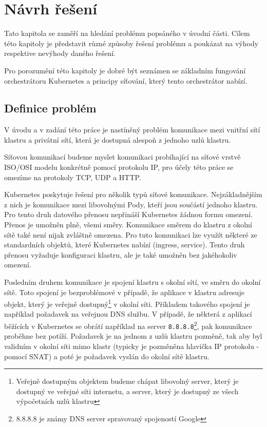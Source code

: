 \chapter{Návrh řešení}

\begin{chapterabstract}
Tato kapitola se zaměří na hledání problému popsáného v úvodní části. Cílem této kapitoly je představit různé způsoby řešení problému a poukázat na výhody respektive nevýhody daného řešení.

Pro porozumění této kapitoly je dobré být seznámen se základním fungování orchestrátoru Kubernetes a principy síťování, který tento orchestrátor nabízí.  
\end{chapterabstract}


\section{Definice problém}
V úvodu a v zadání této práce je nastíněný problém komunikace mezi vnitřní sítí klastru a privátní sítí, která je dostupná alespoň z jednoho uzlů klastru. 

Síťovou komunikací budeme myslet komunikaci probíhající na síťové vrstvě ISO/OSI modelu konkrétně pomocí protokolu IP, pro účely této práce se omezíme na protokoly TCP, UDP a HTTP.

Kubernetes poskytuje řešení pro několik typů síťové komunikace. Nejzákladnějším z nich je komunikace mezi libovolnými Pody, kteří jsou součástí jednoho klastru. Pro tento druh datového přenosu nepřináší Kubernetes žádnou formu omezení. Přenos je umožněn plně, všemi směry. Komunikace směrem do klastru z okolní sítě také není nijak zvláštně omezena. Pro tuto komunikaci lze využít některé ze standardních objektů, které Kubernetes nabízí (ingress, service). Tento druh přenosu vyžaduje konfiguraci klastru, ale je také umožněn bez jakéhokoliv omezení.

Posledním druhem komunikace je spojení klastru s okolní sítí, ve směru do okolní sítě. Toto spojení je bezproblémové v případě, že aplikace v klastru adresuje objekt, který je veřejně dostupný\footnote{Veřejně dostupným objektem budeme chápat libovolný server, který je dostupný ve veřejné síti internetu, a server, který je dostupný ze všech výpočetních uzlů klastru} v okolní síti. Příkladem takového spojení je například požadavek na veřejnou DNS službu. V případě, že některá z aplikací běžících v Kubernetes se obrátí například na server \verb|8.8.8.8|\footnote{8.8.8.8 je známy DNS server spravovaný spojeností Google}, pak komunikace proběhne bez potíží. Požadavek je na jednom z uzlů klastru pozměně, tak aby byl validním v okolní síti mimo klastr (typicky je pozměněna hlavička IP protokolu - pomocí SNAT) a poté je požadavek vyslán do okolní sítě klastru.

